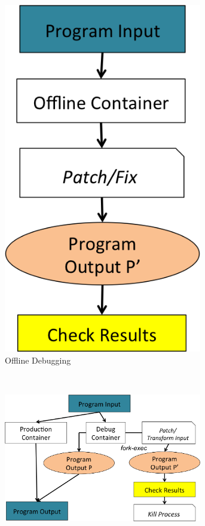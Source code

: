 \begin{figure}[h]
	\centering
	\begin{subfigure}[h]{0.25\textwidth}
		\centering
		\includegraphics[width=0.95\textwidth]{guided/figs/offline.png}
		\caption{Offline Debugging}
		\label{fig:offline-debugging}
	\end{subfigure}%
	~ 	
	\begin{subfigure}[h]{0.75\textwidth}
		\centering
		\includegraphics[width=0.95\textwidth]{guided/figs/active-debugging.png}

\end{subfigure}
\end{figure}
